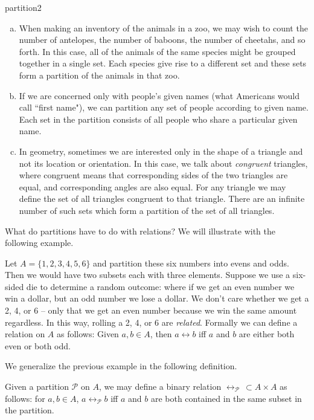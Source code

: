 \begin{example}{partition2}
\begin{enumerate}[(a)]
\item When making an inventory of the animals in a zoo, we may wish to count the number of antelopes, the number of baboons, the number of cheetahs, and so forth. In this case, all of the animals of the same species might be grouped together in a single set. Each species give rise to a different set and these sets form a partition of the animals in that zoo.
\item If we are concerned only with people's given names (what Americans would call ``first name"), we can partition any set of people according to given name. Each set in the partition consists of all people who share a particular given name.
\item In geometry, sometimes we are interested only in the shape of a triangle and not its location or orientation. In this case, we talk about \emph{congruent} triangles, where congruent means that corresponding sides of the two triangles are equal, and corresponding angles are also equal. For any triangle we may define the set of all triangles congruent to that triangle. There are an infinite number of such sets which form a partition of the set of all triangles.
\end{enumerate}
\end{example}


What do partitions have to do with relations? We will illustrate with the following example.

Let $A=\{1,2,3,4,5,6\}$ and partition these six numbers into evens and odds. Then we would have two subsets each with three elements. Suppose we use a six-sided die to determine a random outcome: where if we get an even number we win a dollar, but an odd number we lose a dollar. We don't care whether we get a 2, 4, or 6 -- only that we get an even number because we win the same amount regardless. In this way, rolling a 2, 4, or 6 are \emph{related}. Formally we can define a relation on $A$ as follows: Given $a,b \in A$, then $a \rel b$ iff $a$ and $b$ are either both even or both odd.

We generalize the previous example in the following definition. 

\begin{defn}\label{partitionrelation}
Given a partition $\mathcal{P}$ on $A$, we may define a binary relation $\rel_\mathcal{P}\,\subset A \times A$ as follows: for $a,b \in A$, $a \rel_\mathcal{P} b$ iff $a$ and $b$ are both contained in the same subset in the partition.
\end{defn}

